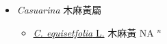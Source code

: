 
  \begin{itemize}
 \item[] \textit{Casuarina} 木麻黃屬
                    
  \begin{itemize}
        \item[] \href{http://www.theplantlist.org/tpl1.1/search?q=Casuarina+equisetfolia}{\textit{C. equisetfolia} L.}   木麻黃 NA $^n$
  \end{itemize}
  \end{itemize}
